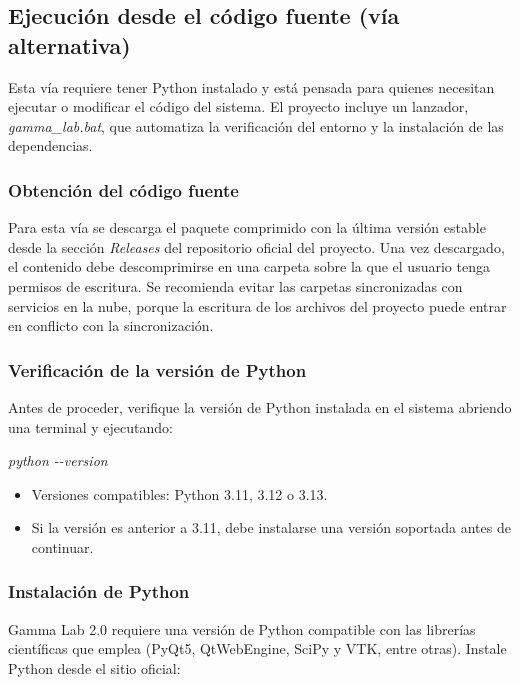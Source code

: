 \documentclass[11pt,a4paper]{article}
\begin{document}
    \subsection{Ejecuci\'on desde el c\'odigo fuente (v\'ia alternativa)}
    Esta v\'ia requiere tener Python instalado y est\'a pensada para quienes necesitan ejecutar o modificar el c\'odigo del sistema. El proyecto incluye un lanzador, \textit{gamma\_lab.bat}, que automatiza la verificaci\'on del entorno y la instalaci\'on de las dependencias.

    \subsubsection{Obtenci\'on del c\'odigo fuente}
    Para esta v\'ia se descarga el paquete comprimido con la \'ultima versi\'on estable desde la secci\'on \emph{Releases} del repositorio oficial del proyecto. Una vez descargado, el contenido debe descomprimirse en una carpeta sobre la que el usuario tenga permisos de escritura. Se recomienda evitar las carpetas sincronizadas con servicios en la nube, porque la escritura de los archivos del proyecto puede entrar en conflicto con la sincronizaci\'on.

    \subsubsection{Verificaci\'on de la versi\'on de Python}
    Antes de proceder, verifique la versi\'on de Python instalada en el sistema abriendo una terminal y ejecutando:

    \begin{center}\textit{python -{}-version}\end{center}

    \begin{itemize}
        \item Versiones compatibles: Python 3.11, 3.12 o 3.13.
        \item Si la versi\'on es anterior a 3.11, debe instalarse una versi\'on soportada antes de continuar.
    \end{itemize}

    \subsubsection{Instalaci\'on de Python}
    Gamma Lab 2.0 requiere una versi\'on de Python compatible con las librer\'ias cient\'ificas que emplea (PyQt5, QtWebEngine, SciPy y VTK, entre otras). Instale Python desde el sitio oficial:
\end{document}

